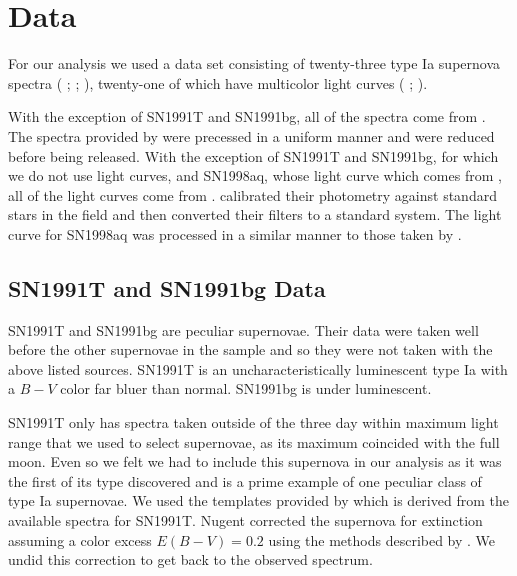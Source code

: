 \section{Data}
For our analysis we used a data set consisting of twenty-three type Ia supernova spectra (\citeauthor{matheson08a} \citeyear{matheson08a}; \citeauthor{nugent02a} \citeyear{nugent02a}; \citeauthor{gomez96a} \citeyear{gomez96a}), twenty-one of which have multicolor light curves (\citeauthor{jha06a} \citeyear{jha06a}; \citeauthor{riess05a} \citeyear{riess05a}).







With the exception of SN1991T and SN1991bg, all of the spectra come from \citeauthor{matheson08a}. The spectra provided by \citeauthor{matheson08a} were precessed in a uniform manner and were reduced before being released. With the exception of SN1991T and SN1991bg, for which we do not use light curves, and SN1998aq, whose light curve which comes from \cite{riess05a}, all of the light curves come from \cite{jha06a}. \citeauthor{jha06a} calibrated their photometry against standard stars in the field and then converted their filters to a standard system.  The light curve for SN1998aq was processed in a similar manner to those taken by \citeauthor{jha06a}.

\subsection{SN1991T and SN1991bg Data} %
SN1991T and SN1991bg are peculiar supernovae. Their data were taken well before the other supernovae in the sample and so they were not taken with the above listed sources. SN1991T is an uncharacteristically luminescent type Ia with a $B-V$ color far bluer than normal. SN1991bg is under luminescent. 

SN1991T only has spectra taken outside of the three day within maximum light range that we used to select supernovae, as its maximum coincided with the full moon. Even so we felt we had to include this supernova in our analysis as it was the first of its type discovered and is a prime example of one peculiar class of type Ia supernovae. We used the templates provided by \citeauthor{nugent02a} which is derived from the available spectra for SN1991T. Nugent corrected the supernova for extinction assuming a color excess $E(B-V) = 0.2$ using the methods described by \cite{cardelli89a}. We undid this correction to get back to the observed spectrum.


